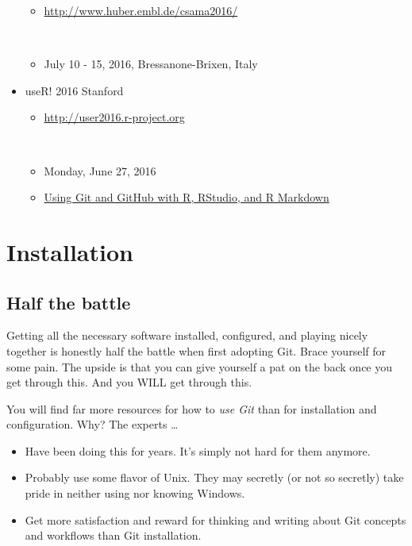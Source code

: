 \documentclass[
]{book}
\providecommand{\tightlist}{%
  \setlength{\itemsep}{0pt}\setlength{\parskip}{0pt}}
\begin{document}
\begin{itemize}
  \begin{itemize}
  \tightlist
  \item
    \url{http://www.huber.embl.de/csama2016/}\strut \\
  \item
    July 10 - 15, 2016, Bressanone-Brixen, Italy\\
  \end{itemize}
\item
  useR! 2016 Stanford

  \begin{itemize}
  \tightlist
  \item
    \url{http://user2016.r-project.org}\strut \\
  \item
    Monday, June 27, 2016\\
  \item
    \href{http://user2016.r-project.org/tutorials/01.html}{Using Git and GitHub with R, RStudio, and R Markdown}
  \end{itemize}
\end{itemize}

\part{Installation}\label{part-installation}

\chapter*{Half the battle}\label{install-intro}

Getting all the necessary software installed, configured, and playing nicely together is honestly half the battle when first adopting Git. Brace yourself for some pain. The upside is that you can give yourself a pat on the back once you get through this. And you WILL get through this.

You will find far more resources for how to \emph{use Git} than for installation and configuration. Why? The experts \ldots{}

\begin{itemize}
\tightlist
\item
  Have been doing this for years. It's simply not hard for them anymore.
\item
  Probably use some flavor of Unix. They may secretly (or not so secretly) take pride in neither using nor knowing Windows.
\item
  Get more satisfaction and reward for thinking and writing about Git concepts and workflows than Git installation.
\end{itemize}
\end{document}
